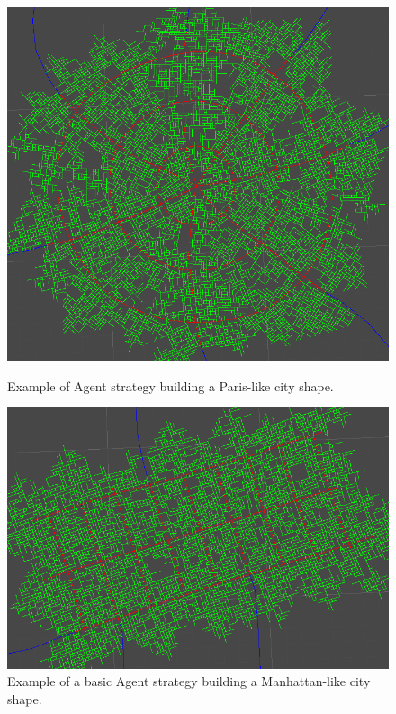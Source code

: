 \begin{figure}[H]
  \centering
  \begin{minipage}{.45\textwidth}
    \centering
    \begin{minipage}{.9\textwidth}
      \centering
      \includegraphics[width=\textwidth]{figure/road_network_paris.png}
      \caption{Example of Agent strategy building a Paris-like city shape.}
      \label{fig:road_network_paris}
    \end{minipage}
  \end{minipage}
  \begin{minipage}{.45\textwidth}
    \begin{minipage}{.9\textwidth}
      \centering
      \centering
      \includegraphics[width=\textwidth]{figure/road_network_manhattan.png}
      \caption{Example of a basic Agent strategy building a Manhattan-like city shape.}
      \label{fig:road_network_manhattan}
    \end{minipage}
  \end{minipage}
\end{figure}


